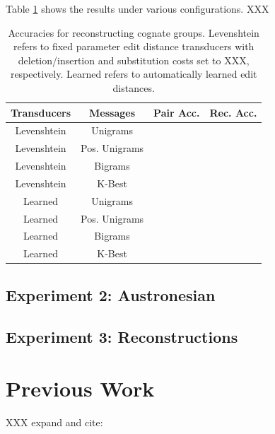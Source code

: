 \documentclass[11pt,a4paper]{article}
\begin{document}
Table \ref{tbl:exp1} shows the results under various configurations. XXX

\begin{table}
  \begin{tabular}{|c|c|c|c|}
    Transducers & Messages & Pair Acc. & Rec. Acc.\\
    \hline
    \hline
    Levenshtein&Unigrams & & \\
    Levenshtein&Pos. Unigrams & & \\
    Levenshtein&Bigrams & & \\
    Levenshtein&K-Best & & \\
    \hline
    Learned&Unigrams & & \\
    Learned&Pos. Unigrams & & \\
    Learned&Bigrams & & \\
    Learned&K-Best & & \\
  \end{tabular}
  \caption{Accuracies for reconstructing cognate groups. Levenshtein
  refers to fixed parameter edit distance transducers with
  deletion/insertion and substitution costs set to XXX, respectively.
  Learned refers to automatically learned edit distances.}
  \label{tbl:exp1}
\end{table}

\subsection{Experiment 2: Austronesian}

\subsection{Experiment 3: Reconstructions}


\section{Previous Work}
XXX expand and cite:
\end{document}
